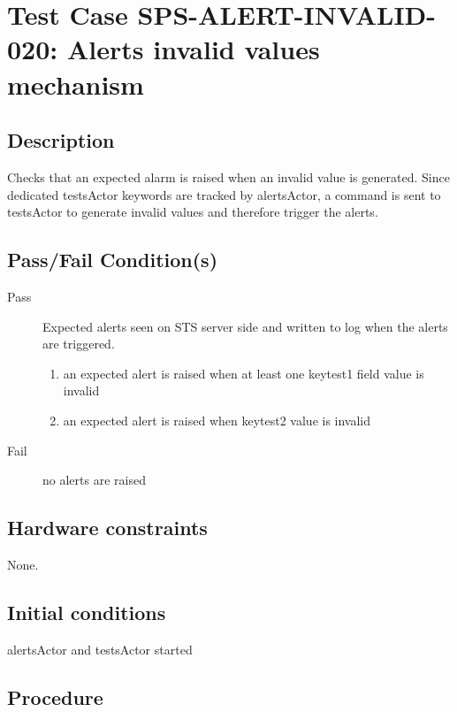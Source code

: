 \section{Test Case SPS-ALERT-INVALID-020: Alerts invalid values mechanism}

\subsection{Description}

Checks that an expected alarm is raised when an invalid value is generated. Since dedicated testsActor keywords are tracked by alertsActor,
a command is sent to testsActor to generate invalid values and therefore trigger the alerts.


\subsection{Pass/Fail Condition(s)}

\begin{description}
\item [Pass] Expected alerts seen on STS server side and written to log when the alerts are triggered.

\begin{enumerate}
    \item an expected alert is raised when at least one keytest1 field value is invalid
    \item an expected alert is raised when keytest2 value is invalid

\end{enumerate}
\item [Fail] no alerts are raised

\end{description}

\subsection{Hardware constraints}

None.


\subsection{Initial conditions}

alertsActor and testsActor started

\subsection{Procedure}
\label{sec:alerts-proc}

